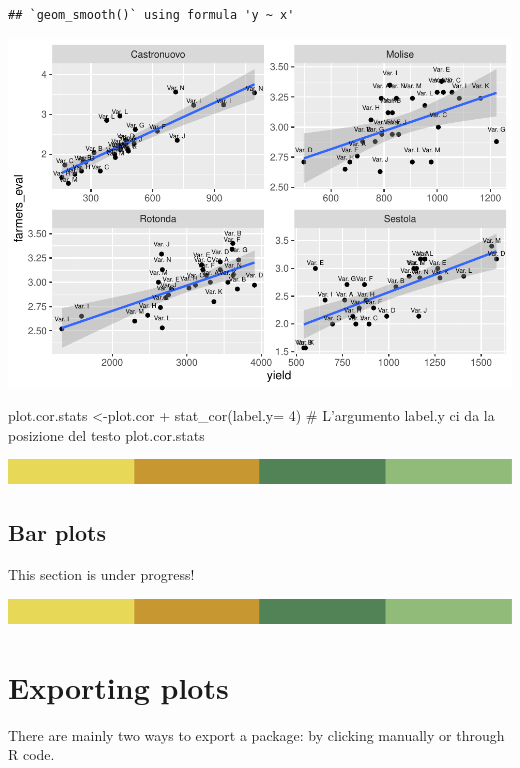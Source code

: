 \documentclass[
]{book}
\begin{document}
\begin{verbatim}
## `geom_smooth()` using formula 'y ~ x'
\end{verbatim}

\includegraphics{PPB-Toolkit-for-R-and-R-Studio_files/figure-latex/unnamed-chunk-71-1.pdf}

plot.cor.stats \textless-plot.cor + stat\_cor(label.y= 4) \# L'argumento label.y ci da la posizione del testo
plot.cor.stats

\includegraphics{rsrstrip.png}

\hypertarget{bar-plots}{%
\subsection{Bar plots}\label{bar-plots}}

This section is under progress!

\includegraphics{rsrstrip.png}

\hypertarget{exporting-plots}{%
\section{Exporting plots}\label{exporting-plots}}

There are mainly two ways to export a package: by clicking manually or through R code.
\end{document}
